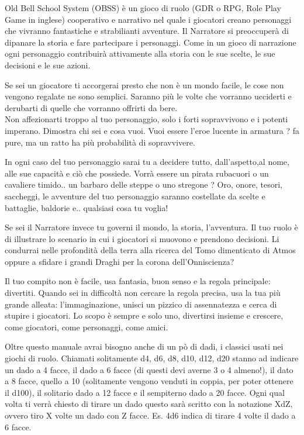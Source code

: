 \documentclass[10pt,a4paper]{article}
\begin{document}
Old Bell School System (OBSS) è un gioco di ruolo (GDR o RPG, Role Play Game in inglese) cooperativo e narrativo nel quale i giocatori creano personaggi che vivranno fantastiche e strabilianti avventure. Il Narratore si preoccuperà di dipanare la storia e fare partecipare i personaggi. Come in un gioco di narrazione ogni personaggio contribuirà attivamente alla storia con le sue scelte, le sue decisioni e le sue azioni.

Se sei un giocatore ti accorgerai presto che non è un mondo facile, le cose non vengono regalate ne sono semplici. Saranno più le volte che vorranno ucciderti e derubarti di quelle che vorranno offrirti da bere.\\
Non affezionarti troppo al tuo personaggio, solo i forti sopravvivono e i potenti imperano. Dimostra chi sei e cosa vuoi. Vuoi essere l'eroe lucente in armatura ? fa pure, ma un ratto ha più probabilità di sopravvivere.

In ogni caso del tuo personaggio sarai tu a decidere tutto, dall'aspetto,al nome, alle sue capacità e ciò che possiede. Vorrà essere un pirata rubacuori o un cavaliere timido.. un barbaro delle steppe o uno stregone ? Oro, onore, tesori, saccheggi, le avventure del tuo personaggio saranno costellate da scelte e battaglie, baldorie e.. qualsiasi cosa tu voglia!

Se sei il Narratore invece tu governi il mondo,  la storia, l'avventura. Il tuo ruolo è di illustrare lo scenario in cui i giocatori si muovono e prendono decisioni. Li condurrai nelle profondità della terra alla ricerca del Tomo dimenticato di Atmos oppure a sfidare i grandi Draghi per la corona dell'Onniscienza?

Il tuo compito non è facile, usa fantasia, buon senso e la regola principale: divertiti. Quando sei in difficoltà non cercare la regola precisa, usa la tua più grande alleata: l'immaginazione, unisci un pizzico di assennatezza e cerca di stupire i giocatori. Lo scopo è sempre e solo uno, divertirsi insieme e crescere, come giocatori, come personaggi, come amici.

Oltre questo manuale avrai bisogno anche di un pò di dadi, i classici usati nei giochi di ruolo.
Chiamati solitamente d4, d6, d8, d10, d12, d20 stanno ad indicare un dado a 4 facce, il dado a 6 facce (di questi devi averne 3 o 4 almeno!), il dato a 8 facce, quello a 10 (solitamente vengono venduti in coppia, per poter ottenere il d100), il solitario dado a 12 facce e il sempiterno dado a 20 facce.
Ogni qual volta ti verrà chiesto di tirare un dado questo sarà scritto con la notazione XdZ, ovvero tiro X volte un dado con Z facce. Es. 4d6 indica di tirare 4 volte il dado a 6 facce.
\end{document}
